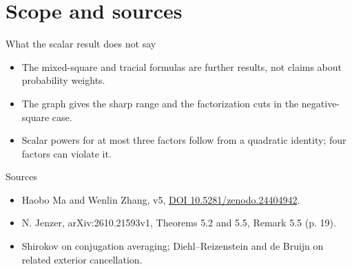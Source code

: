 \documentclass{beamer}
\begin{document}
\section{Scope and sources}
\begin{frame}{What the scalar result does not say}
  \begin{itemize}
    \item The mixed-square and tracial formulas are further results, not claims about probability weights.
    \item The graph gives the sharp range and the factorization cuts in the negative-square case.
    \item Scalar powers for at most three factors follow from a quadratic identity; four factors can violate it.
  \end{itemize}
\end{frame}
\begin{frame}{Sources}
  \begin{itemize}
    \item Haobo Ma and Wenlin Zhang, v5, \href{https://doi.org/10.5281/zenodo.24404942}{DOI 10.5281/zenodo.24404942}.
    \item N. Jenzer, arXiv:2610.21593v1, Theorems 5.2 and 5.5, Remark 5.5 (p. 19).
    \item Shirokov on conjugation averaging; Diehl--Reizenstein and de Bruijn on related exterior cancellation.
  \end{itemize}
\end{frame}
\appendix
\FormalVerification
\end{document}
